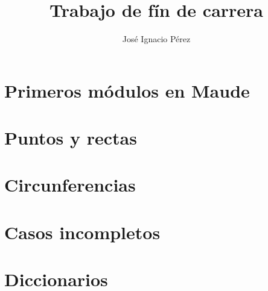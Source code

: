 \documentclass[12pt,a4paper,draft]{book}
\author{Jos\'e Ignacio P\'erez}
\title{Trabajo de f\'in de carrera}
\begin{document}
\newcommand{\codesize}{\small}



\tableofcontents

\chapter{Primeros módulos en Maude}\label{cap.1}

\chapter{Puntos y rectas}\label{cap.2}

\chapter{Circunferencias}\label{cap.3}

\chapter{Casos incompletos}\label{cap.4}

\chapter{Diccionarios}\label{cap.5}

\end{document}
